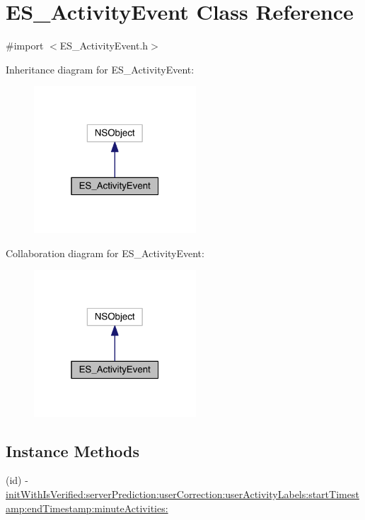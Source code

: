 \hypertarget{interface_e_s___activity_event}{\section{E\+S\+\_\+\+Activity\+Event Class Reference}
\label{interface_e_s___activity_event}
}


{\ttfamily \#import $<$E\+S\+\_\+\+Activity\+Event.\+h$>$}



Inheritance diagram for E\+S\+\_\+\+Activity\+Event\+:\nopagebreak
\begin{figure}[H]
\begin{center}
\leavevmode
\includegraphics[width=172pt]{dd/de8/interface_e_s___activity_event__inherit__graph}
\end{center}
\end{figure}


Collaboration diagram for E\+S\+\_\+\+Activity\+Event\+:\nopagebreak
\begin{figure}[H]
\begin{center}
\leavevmode
\includegraphics[width=172pt]{d7/d5c/interface_e_s___activity_event__coll__graph}
\end{center}
\end{figure}
\subsection*{Instance Methods}
\begin{DoxyCompactItemize}
\item 
(id) -\/ \hyperlink{interface_e_s___activity_event_a318492fa549d8d2d9d5b318552552a8c}{init\+With\+Is\+Verified\+:server\+Prediction\+:user\+Correction\+:user\+Activity\+Labels\+:start\+Timestamp\+:end\+Timestamp\+:minute\+Activities\+:}
\end{DoxyCompactItemize}
